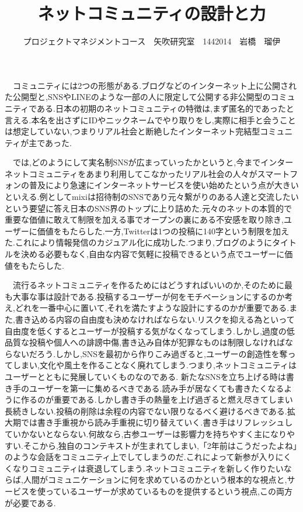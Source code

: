 \documentclass[uplatex,twocolumn,dvipdfmx]{jsarticle}
\title{\vspace{-5mm}\fontsize{14pt}{0pt}\selectfont ネットコミュニティの設計と力}
\author{\normalsize プロジェクトマネジメントコース　矢吹研究室　1442014　岩橋　瑠伊}
\date{}
\begin{document}
\fontsize{10.5pt}{\baselineskip}\selectfont
\maketitle





　コミュニティには2つの形態がある.ブログなどのインターネット上に公開された公開型と,SNSやLINEのような一部の人に限定して公開する非公開型のコミュニティである.日本の初期のネットコミュニティの特徴は,まず匿名的であったと言える.本名を出さずにIDやニックネームでやり取りをし,実際に相手と会うことは想定していない,つまりリアル社会と断絶したインターネット完結型コミュニティが主であった.

　では,どのようにして実名制SNSが広まっていったかというと,今までインターネットコミュニティをあまり利用してこなかったリアル社会の人々がスマートフォンの普及により急速にインターネットサービスを使い始めたという点が大きいといえる.例としてmixiは招待制のSNSであり元々繋がりのある人達と交流したいという要望に答え日本のSNS界のトップに上り詰めた.元々のネットの本質的で重要な価値に敢えて制限を加える事でオープンの裏にある不安感を取り除き,ユーザーに価値をもたらした.一方,Twitterは1つの投稿に140字という制限を加えた.これにより情報発信のカジュアル化に成功した.つまり,ブログのようにタイトルを決める必要もなく,自由な内容で気軽に投稿できるという点でユーザーに価値をもたらした.

　流行るネットコミュニティを作るためにはどうすればいいのか,そのために最も大事な事は設計である.投稿するユーザーが何をモチベーションにするのか考え,どれを一番中心に置いて,それを満たすような設計にするのかが重要である.また,書き込める内容の自由度も決めなければならない.リスクを抑える為といって自由度を低くするとユーザーが投稿する気がなくなってしまう.しかし,過度の低品質な投稿や個人への誹謗中傷,書き込み自体が犯罪なものは制限しなければならないだろう.しかし,SNSを最初から作りこみ過ぎると,ユーザーの創造性を奪ってしまい,文化や風土を作ることなく廃れてしまう.つまり,ネットコミュニティはユーザーとともに発展していくものなのである.
新たなSNSを立ち上げる時は書き手のユーザーを第一に集めるべきである.読み手が居なくても書きたくなるように作るのが重要である.しかし書き手の熱量を上げ過ぎると燃え尽きてしまい長続きしない.投稿の削除は余程の内容でない限りなるべく避けるべきである.拡大期では書き手重視から読み手重視に切り替えていく.書き手はリフレッシュしていかないとならない.何故なら,古参ユーザーは影響力を持ちやすく主になりやすい.そこから,独自のコンテキストが生まれてしまい,「2年前はこうだったよね」のような会話をコミュニティ上でしてしまうのだ.これによって新参が入りにくくなりコミュニティは衰退してしまう.ネットコミュニティを新しく作りたいならば,人間がコミュニケーションに何を求めているのかという根本的な視点と,サービスを使っているユーザーが求めているものを提供するという視点,この両方が必要である.
\end{document}
